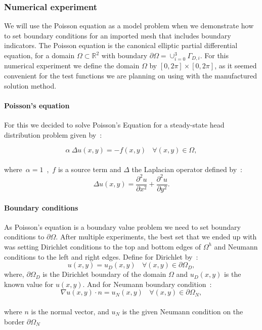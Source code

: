 \documentclass{article}
\begin{document}
\subsubsection{Numerical experiment}

We will use the Poisson equation as a model problem when we demonstrate how to set boundary conditions for an imported mesh that includes boundary indicators. The Poisson equation is the canonical elliptic partial differential equation, for a domain $\Omega \subset \mathbb{R}^2$ with boundary $\partial \Omega = \cup_{i = 0}^3 \Gamma_{D, i}$. For this numerical experiment we define the domain $\Omega$ by $[0, 2\pi] \times [0, 2\pi]$, as it seemed convenient for the test functions we are planning on using with the manufactured solution method.

\paragraph{Poisson's equation}
For this we decided to solve Poisson's Equation for a steady-state head distribution problem given by~:

\[
\boxed{\alpha~\Delta u(x,y) = - f(x,y) ~~~~\forall (x,y) \in \Omega},
\]\\
where~$\alpha = 1$~,~$f$ is a source term and $\Delta$ the Laplacian operator defined by~:
\[
\Delta{u(x,y)} = \frac{{\partial^2 u}}{\partial x^2} + \frac{{\partial^2 u}}{\partial y^2}.
\]

\paragraph{Boundary conditions}
As Poisson's equation is a boundary value problem we need to set boundary conditions to $\partial\Omega$. After multiple experiments, the best set that we ended up with was setting Dirichlet conditions to the top and bottom edges of $\Omega^h$ and Neumann conditions to the left and right edges. Define for Dirichlet by~:
\[
u(x,y) = u_D(x,y)~~~~\forall (x,y) \in \partial\Omega_D,
\]
where, $\partial\Omega_D$ is the Dirichlet boundary of the domain $\Omega$ and $u_D(x,y)$ is the known value for $u(x,y)$. And for Neumann boundary condition~:
\[
\nabla u(x,y) \cdot n = u_N(x,y)~~~~\forall (x,y) \in \partial\Omega_N,
\]\\
where $n$ is the normal vector, and $u_N$ is the given Neumann condition on the border $\partial\Omega_N$
\end{document}

